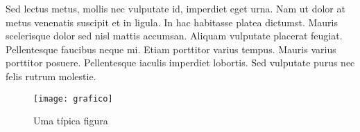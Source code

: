 Sed lectus metus, mollis nec vulputate id, imperdiet eget urna. Nam ut dolor at metus venenatis suscipit et in ligula. In hac habitasse platea dictumst. Mauris scelerisque dolor sed nisl mattis accumsan. Aliquam vulputate placerat feugiat. Pellentesque faucibus neque mi. Etiam porttitor varius tempus. Mauris varius porttitor posuere. Pellentesque iaculis imperdiet lobortis. Sed vulputate purus nec felis rutrum molestie. 


\begin{figure}[!htp]
\centering
\texttt{[image: grafico]}
\caption{Uma típica figura}
\end{figure}



